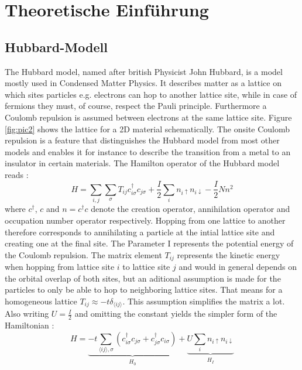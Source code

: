 \chapter{Theoretische Einführung}
\label{sec:theo}

\section{Hubbard-Modell}
The Hubbard model, named after british Physicist John Hubbard, is a model mostly used in Condensed Matter Physics. It describes matter as a lattice on which sites particles e.g. electrons can hop to another lattice site, while in case of fermions they must, of course, respect the Pauli principle. Furthermore a Coulomb repulsion is assumed between electrons at the same lattice site. Figure \ref{fig:pic2} shows the lattice for a 2D material schematically. The onsite Coulomb repulsion is a feature that distinguishes the Hubbard model from most other models and enables it for instance to describe the transition from a metal to an insulator in certain materials. The Hamilton operator of the Hubbard model reads \cite{Hubbard}:
\begin{equation}\label{Hubbard_original}
H = \sum_{i,j}\sum_{\sigma}T_{ij} c_{i\sigma}^\dag c_{j\sigma} + \frac{I}{2} \sum_{i}n_{i\uparrow}n_{i\downarrow} - \frac{I}{2}Nn^2
\end{equation}
where $ c^\dag $,  $ c $ and $ n = c^\dag c $ denote the creation operator, annihilation operator and occupation number operator respectively. Hopping from one lattice to another therefore corresponds to annihilating a particle at the intial lattice site and creating one at the final site. The Parameter I represents the potential energy of the Coulomb repulsion. The matrix element $ T_{ij} $ represents the kinetic energy when hopping from lattice site $i$ to lattice site $j$ and would in general depends on the orbital overlap of both sites, but an aditional assumption is made for the particles to only be able to hop to neighboring lattice sites.  That means for a homogeneous lattice $ T_{ij} \approx -t\delta_{\langle ij \rangle} $\cite{schoett2014}. This assumption simplifies the matrix a lot. Also writing  $ U = \frac{I}{2} $ and omitting the constant yields the simpler form of the Hamiltonian \cite{Rickayzen,schoett2014}:
\begin{equation}\label{Hubbard_standard}
H = \underbrace{-t\sum_{\langle ij\rangle,\sigma}\left( c_{i\sigma}^\dag c_{j\sigma} + c_{j\sigma}^\dag c_{i\sigma}\right)}_{\substack{H_0}}  + \underbrace{U \sum_{i}n_{i\uparrow}n_{i\downarrow}}_{\substack{H_I}}
\end{equation}
